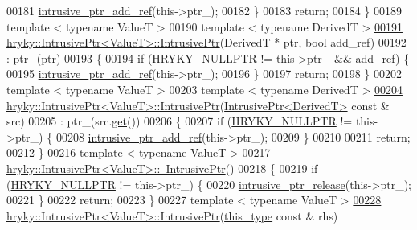 \begin{DoxyCode}
00181         \hyperlink{namespacehryky_1_1reduction_ab59dece4af8e91c10781e3b092c06d1b}{intrusive_ptr_add_ref}(this->ptr\_);
00182     \}
00183     \textcolor{keywordflow}{return};
00184 \}
00189 \textcolor{keyword}{template} < \textcolor{keyword}{typename} ValueT >
00190 \textcolor{keyword}{template} < \textcolor{keyword}{typename} DerivedT >
\hypertarget{intrusive__ptr_8h_source_l00191}{}\hyperlink{classhryky_1_1_intrusive_ptr_ae2f947d01984f4e16ec59ce529be4a8e}{00191} \hyperlink{classhryky_1_1_intrusive_ptr}{hryky::IntrusivePtr<ValueT>::IntrusivePtr}(DerivedT * ptr, \textcolor{keywordtype}{bool} add\_ref)
00192     : ptr\_(ptr)
00193 \{
00194     \textcolor{keywordflow}{if} (\hyperlink{common_8h_a4cd4ac09cfcdbd6b30ee69afc156e210}{HRYKY_NULLPTR} != this->ptr\_ && add\_ref) \{
00195         \hyperlink{namespacehryky_1_1reduction_ab59dece4af8e91c10781e3b092c06d1b}{intrusive_ptr_add_ref}(this->ptr\_);
00196     \}
00197     \textcolor{keywordflow}{return};
00198 \}
00202 \textcolor{keyword}{template} < \textcolor{keyword}{typename} ValueT >
00203 \textcolor{keyword}{template} < \textcolor{keyword}{typename} DerivedT >
\hypertarget{intrusive__ptr_8h_source_l00204}{}\hyperlink{classhryky_1_1_intrusive_ptr_a99d5812ce929ad04b2269533283c9cae}{00204} \hyperlink{classhryky_1_1_intrusive_ptr}{hryky::IntrusivePtr<ValueT>::IntrusivePtr}(\hyperlink{classhryky_1_1_intrusive_ptr}{IntrusivePtr<DerivedT>} \textcolor{keyword}{const} & src)
00205     : ptr\_(src.\hyperlink{namespacehryky_1_1log_1_1writer_a67d38d407be7aaf3cc9ed3ac8e3b2835}{get}())
00206 \{
00207     \textcolor{keywordflow}{if} (\hyperlink{common_8h_a4cd4ac09cfcdbd6b30ee69afc156e210}{HRYKY_NULLPTR} != this->ptr\_) \{
00208         \hyperlink{namespacehryky_1_1reduction_ab59dece4af8e91c10781e3b092c06d1b}{intrusive_ptr_add_ref}(this->ptr\_);
00209     \}
00210     
00211     \textcolor{keywordflow}{return};
00212 \}
00216 \textcolor{keyword}{template} < \textcolor{keyword}{typename} ValueT >
\hypertarget{intrusive__ptr_8h_source_l00217}{}\hyperlink{classhryky_1_1_intrusive_ptr_a3a97da2eb0bb0cab67e92e83b6a25ebc}{00217} \hyperlink{classhryky_1_1_intrusive_ptr}{hryky::IntrusivePtr<ValueT>::~IntrusivePtr}()
00218 \{
00219     \textcolor{keywordflow}{if} (\hyperlink{common_8h_a4cd4ac09cfcdbd6b30ee69afc156e210}{HRYKY_NULLPTR} != this->ptr\_) \{
00220         \hyperlink{namespacehryky_1_1reduction_ab54d3281488314c37ed3906b45c8f866}{intrusive_ptr_release}(this->ptr\_);
00221     \}
00222     \textcolor{keywordflow}{return};
00223 \}
00227 \textcolor{keyword}{template} < \textcolor{keyword}{typename} ValueT >
\hypertarget{intrusive__ptr_8h_source_l00228}{}\hyperlink{classhryky_1_1_intrusive_ptr_a942bdb1ed6d59e80271c0979b44e543b}{00228} \hyperlink{classhryky_1_1_intrusive_ptr}{hryky::IntrusivePtr<ValueT>::IntrusivePtr}(\hyperlink{classhryky_1_1_intrusive_ptr}{this_type} \textcolor{keyword}{const} & rhs)

\end{DoxyCode}
